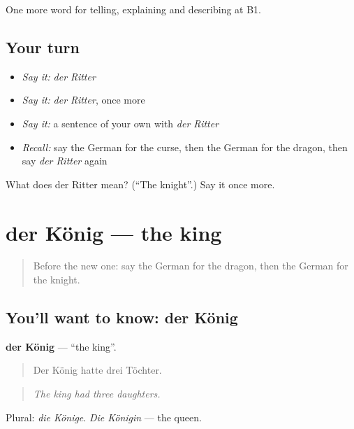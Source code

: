 \begin{grammarlens}[title={What you've built}]
One more word for telling, explaining and describing at B1.
\end{grammarlens}

\subsection*{Your turn}
\begin{itemize}
\raggedright
  \item \emph{Say it:} \emph{der Ritter}
  \item \emph{Say it:} \emph{der Ritter}, once more
  \item \emph{Say it:} a sentence of your own with \emph{der Ritter}
  \item \emph{Recall:} say the German for the curse, then the German for the dragon, then say \emph{der Ritter} again
\end{itemize}

\begin{tcolorbox}[breakable,colback=teal!4,colframe=teal!35!black,title={Before you move on}]
What does der Ritter mean? (\textquotedblleft{}The knight\textquotedblright{}.) Say it once more.
\end{tcolorbox}
\section[der König]{der König — the king}

\label{lesson:GE-C315-koenig}



\begin{quote}
Before the new one: say the German for the dragon, then the German for the knight.
\end{quote}

\subsection*{You'll want to know: der König}
\textbf{der König} — \textquotedblleft{}the king\textquotedblright{}.

\begin{quote}
Der König hatte drei Töchter.
\end{quote}

\begin{quote}
\emph{The king had three daughters.}
\end{quote}

Plural: \emph{die Könige}. \emph{Die Königin} — the queen.

